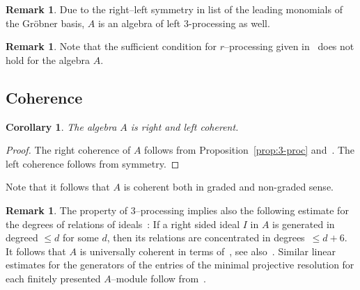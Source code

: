 \documentclass{amsart}
\numberwithin{equation}{section}
\theoremstyle{plain}
\newtheorem{cor}[theorem]{Corollary}
\theoremstyle{definition}
\newtheorem{rema}[theorem]{Remark}
\begin{document}
\begin{rema}
Due to the right--left symmetry in list of the leading monomials of the Gr\"obner basis, $A$ is an algebra of left $3$-processing as well.
\end{rema}

\begin{rema}
Note that the sufficient condition for $r$--processing given in~\cite[Prop.~2]{pi01} does not 
hold for the algebra $A$.
\end{rema}

\subsection{Coherence}

\begin{cor}
\label{cor:main}
The algebra $A$ is right and left coherent.
\end{cor}

\begin{proof}
The right coherence of $A$ follows from Proposition~\ref{prop:3-proc} and~\cite[Th.~8]{pi01}.
The left coherence 
follows from symmetry. 
\end{proof}

Note that it follows that $A$ is coherent both in graded and non-graded sense. 

\begin{rema}
\label{rem:uni-coh}
The property of $3$--processing implies also the following estimate for the degrees of relations of ideals~\cite[Prop.~7]{pi01}: 
If a right sided  ideal $I$ in $A$ is generated in degreed $\le d$ for some $d$, then its relations are concentrated in degrees~$\le d+6$. 
It follows that $A$ is universally coherent in terms of~\cite{pi4}, see also~\cite[Prop.~4.10]{pi4}. 
Similar linear estimates for the generators of the entries 
of the  minimal projective resolution for each
 finitely presented $A$--module follow from~\cite[Prop.~4.3]{pi4}. 
\end{rema}
\end{document}
